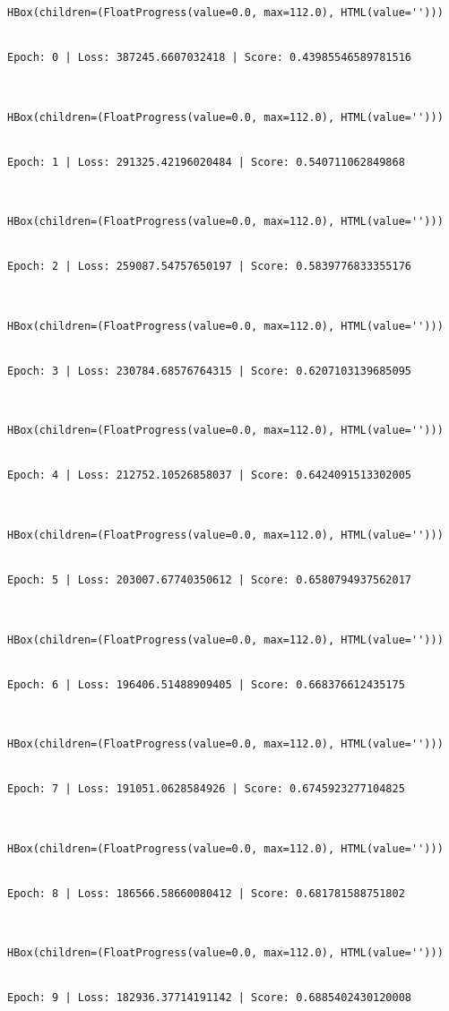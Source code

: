 \documentclass[
]{article}
\begin{document}
\begin{verbatim}
HBox(children=(FloatProgress(value=0.0, max=112.0), HTML(value='')))


Epoch: 0 | Loss: 387245.6607032418 | Score: 0.43985546589781516



HBox(children=(FloatProgress(value=0.0, max=112.0), HTML(value='')))


Epoch: 1 | Loss: 291325.42196020484 | Score: 0.540711062849868



HBox(children=(FloatProgress(value=0.0, max=112.0), HTML(value='')))


Epoch: 2 | Loss: 259087.54757650197 | Score: 0.5839776833355176



HBox(children=(FloatProgress(value=0.0, max=112.0), HTML(value='')))


Epoch: 3 | Loss: 230784.68576764315 | Score: 0.6207103139685095



HBox(children=(FloatProgress(value=0.0, max=112.0), HTML(value='')))


Epoch: 4 | Loss: 212752.10526858037 | Score: 0.6424091513302005



HBox(children=(FloatProgress(value=0.0, max=112.0), HTML(value='')))


Epoch: 5 | Loss: 203007.67740350612 | Score: 0.6580794937562017



HBox(children=(FloatProgress(value=0.0, max=112.0), HTML(value='')))


Epoch: 6 | Loss: 196406.51488909405 | Score: 0.668376612435175



HBox(children=(FloatProgress(value=0.0, max=112.0), HTML(value='')))


Epoch: 7 | Loss: 191051.0628584926 | Score: 0.6745923277104825



HBox(children=(FloatProgress(value=0.0, max=112.0), HTML(value='')))


Epoch: 8 | Loss: 186566.58660080412 | Score: 0.681781588751802



HBox(children=(FloatProgress(value=0.0, max=112.0), HTML(value='')))


Epoch: 9 | Loss: 182936.37714191142 | Score: 0.6885402430120008
\end{verbatim}
\end{document}
